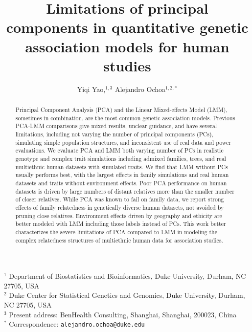 \documentclass[11pt]{article}
\title{\Large \textbf{
    Limitations of principal components in quantitative genetic association models for human studies
  }}
\author{Yiqi Yao,$^{1,3}$ Alejandro Ochoa$^{1,2,*}$}
\date{}
\begin{document}
\begin{linenumbers}

\maketitle

\noindent
$^1$ Department of Biostatistics and Bioinformatics, Duke University, Durham, NC 27705, USA \\
$^2$ Duke Center for Statistical Genetics and Genomics, Duke University, Durham, NC 27705, USA \\
$^3$ Present address: BenHealth Consulting, Shanghai, Shanghai, 200023, China \\
$^*$ Correspondence: \texttt{alejandro.ochoa@duke.edu}

\begin{abstract}
  Principal Component Analysis (PCA) and the Linear Mixed-effects Model (LMM), sometimes in combination, are the most common genetic association models.
  Previous PCA-LMM comparisons give mixed results, unclear guidance, and have several limitations, including not varying the number of principal components (PCs), simulating simple population structures, and inconsistent use of real data and power evaluations.
  We evaluate PCA and LMM both varying number of PCs in realistic genotype and complex trait simulations including admixed families, trees, and real multiethnic human datasets with simulated traits.
  We find that LMM without PCs usually performs best, with the largest effects in family simulations and real human datasets and traits without environment effects.
  Poor PCA performance on human datasets is driven by large numbers of distant relatives more than the smaller number of closer relatives.
  While PCA was known to fail on family data, we report strong effects of family relatedness in genetically diverse human datasets, not avoided by pruning close relatives.
  Environment effects driven by geography and ethicity are better modeled with LMM including those labels instead of PCs.
  This work better characterizes the severe limitations of PCA compared to LMM in modeling the complex relatedness structures of multiethnic human data for association studies.
\end{abstract}



\end{linenumbers}
\end{document}
